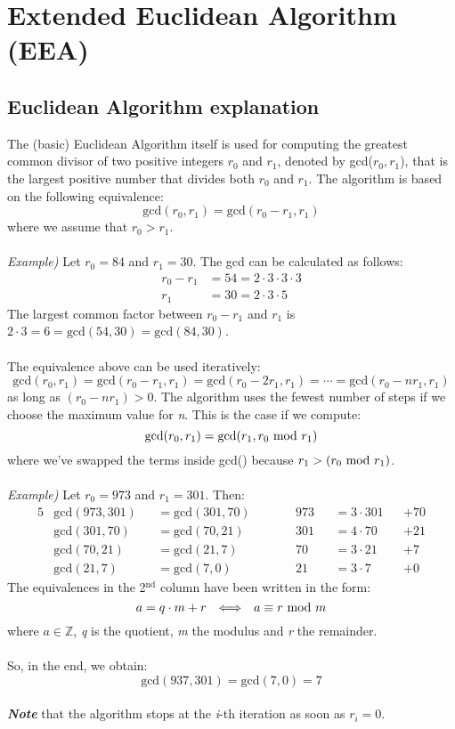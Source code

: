 \newpage


\newpage
\section{Extended Euclidean Algorithm (EEA)}
\subsection{Euclidean Algorithm explanation}
The (basic) Euclidean Algorithm itself is used for computing the greatest common divisor of two positive integers $r_0$ and $r_1$, denoted by gcd($r_0,r_1$), that is the largest positive number that divides both $r_0$ and $r_1$. The algorithm is based on the following equivalence:
$$\text{gcd}(r_0,r_1)=\text{gcd}(r_0-r_1,r_1)$$
where we assume that $r_0>r_1$.\\\\
\textit{Example)} Let $r_0=84$ and $r_1=30$. The gcd can be calculated as follows:
\begin{equation*}
    \begin{split}
        r_0-r_1&=54=2\cdot3\cdot3\cdot3\\
        r_1&=30=2\cdot3\cdot5
    \end{split}
\end{equation*}
The largest common factor between $r_0-r_1$ and $r_1$ is $2\cdot3=6=\text{gcd}(54,30)=\text{gcd}(84,30)$.\\\\
The equivalence above can be used iteratively:
$$\text{gcd}(r_0,r_1)=\text{gcd}(r_0-r_1,r_1)=\text{gcd}(r_0-2r_1,r_1)=\cdots=\text{gcd}(r_0-nr_1,r_1)$$
as long as $(r_0-nr_1)>0$. The algorithm uses the fewest number of steps if we choose the maximum value for \textit{n}. This is the case if we compute:
$$\text{gcd}(r_0,r_1)=\text{gcd}(r_1,r_0\text{ mod } r_1)$$
where we've swapped the terms inside gcd() because $r_1>(r_0\text{ mod } r_1)$.\\\\
\textit{Example)} Let $r_0=973$ and $r_1=301$. Then:
\begin{alignat*}{5}
    &\text{gcd}(973,301)&&=\text{gcd}(301,70) \qquad&&973&&=3\cdot301&&+70\\
    &\text{gcd}(301,70)&&=\text{gcd}(70,21)  \qquad&&301&&=4\cdot70&&+21\\
    &\text{gcd}(70,21)&&=\text{gcd}(21,7)  \qquad&&70&&=3\cdot21&&+7\\
    &\text{gcd}(21,7)&&=\text{gcd}(7,0)  \qquad&&21&&=3\cdot7&&+0
\end{alignat*}
The equivalences in the 2$^\text{nd}$ column have been written in the form:
$$a=q\cdot m+r\hspace{0.25cm}\Longleftrightarrow\hspace{0.25cm} a \equiv r\text{ mod } m$$
where $a\in\mathbb{Z}$, \textit{q} is the quotient, \textit{m} the modulus and \textit{r} the remainder.\\\\
So, in the end, we obtain: $$\text{gcd}(937,301)=\text{gcd}(7,0)=7$$\\
\textit{\textbf{Note}} that the algorithm stops at the \textit{i}-th iteration as soon as $r_i=0$.

